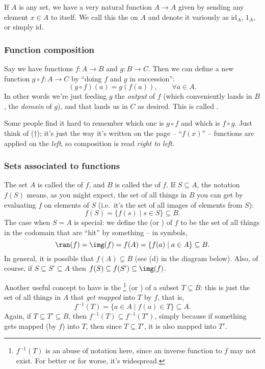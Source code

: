 \begin{example}
If $A$ is any set, we have a very natural function $A \to A$ given by sending any element $x \in A$ to itself. We call this the  on $A$ and denote it variously as $\mathrm{id}_A$, $1_A$, or simply $\mathrm{id}$.
\end{example}

\subsubsection{Function composition}

\begin{definition}
Say we have functions $f : A \to B$ and $g : B \to C$. Then we can define a new function $g \circ f : A \to C$ by ``doing $f$ and $g$ in succession'':
\[ (g \circ f)(a) = g(f(a)), \qquad \forall a \in A. \tag{$\dagger$} \]
In other words we're just feeding $g$ the \emph{output} of $f$ (which conveniently lands in $B$, the \emph{domain} of $g$), and that lands us in $C$ as desired. This is called .
\end{definition}

Some people find it hard to remember which one is $g \circ f$ and which is $f \circ g$. Just think of ($\dagger$); it's just the way it's written on the page -- ``$f(x)$'' -- functions are applied on the \emph{left}, so composition is read \emph{right to left}.

\subsubsection{Sets associated to functions}

The set $A$ is called the  of $f$, and $B$ is called the  of $f$. If $S \subseteq A$, the notation $f(S)$ means, as you might expect, the set of all things in $B$ you can get by evaluating $f$ on elements of $S$ (i.e.\ it's the set of all images of elements from $S$):
\[ f(S) = \{ f(s) \mid s \in S \} \subseteq B. \]
The case when $S=A$ is special: we define the  (or ) of $f$ to be the set of all things in the codomain that are ``hit'' by something -- in symbols,
\[ \ran(f) = \img(f) = f(A) = \{ f(a) \mid a \in A \} \subseteq B. \]
In general, it is possible that $f(A) \subsetneq B$ (see (d) in the diagram below). Also, of course, if $S \subseteq S' \subseteq A$ then $f(S) \subseteq f(S') \subseteq \img(f)$.

Another useful concept to have is the \footnote{$f^{-1}(T)$ is an abuse of notation here, since an inverse function to $f$ may not exist. For better or for worse, it's widespread.} (or ) of a subset $T \subseteq B$: this is just the set of all things in $A$ that \emph{get mapped} into $T$ by $f$, that is,
\[ f^{-1}(T) = \{ a \in A \mid f(a) \in T \} \subseteq A. \]
Again, if $T \subseteq T' \subseteq B$, then $f^{-1}(T) \subseteq f^{-1}(T')$, simply because if something gets mapped (by $f$) into $T$, then since $T \subseteq T'$, it is also mapped into $T'$.

